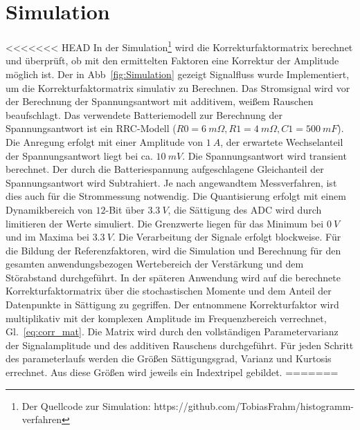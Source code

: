 \section{Simulation}

<<<<<<< HEAD
In der Simulation\footnote[2]{Der Quellcode zur Simulation: https://github.com/TobiasFrahm/histogramm-verfahren} wird die Korrekturfaktormatrix berechnet und überprüft, ob mit den ermittelten Faktoren eine Korrektur der Amplitude möglich ist. 
Der in Abb~\ref{fig:Simulation} gezeigt Signalfluss wurde Implementiert, um die Korrekturfaktormatrix simulativ zu Berechnen. Das Stromsignal wird vor der Berechnung der Spannungsantwort mit additivem, weißem Rauschen beaufschlagt. Das verwendete Batteriemodell zur Berechnung der Spannungsantwort ist ein RRC-Modell ($R0 = \SI{6}{m\Omega}, R1=\SI{4}{m\Omega}, C1=\SI{500}{mF}$). Die Anregung erfolgt mit einer Amplitude von $\SI{1}{A}$, der erwartete Wechselanteil der Spannungsantwort liegt bei ca. $\SI{10}{mV}$. Die Spannungsantwort wird transient berechnet. Der durch die Batteriespannung aufgeschlagene Gleichanteil der Spannungsantwort wird Subtrahiert. Je nach angewandtem Messverfahren, ist dies auch für die Strommessung notwendig. Die Quantisierung erfolgt mit einem Dynamikbereich von $12$-Bit über $\SI{3.3}{V}$, die Sättigung des ADC wird durch limitieren der Werte simuliert. Die Grenzwerte liegen für das Minimum bei $\SI{0}{V}$ und im Maxima bei $\SI{3.3}{V}$. Die Verarbeitung der Signale erfolgt blockweise. Für die Bildung der Referenzfaktoren, wird die Simulation und Berechnung für den gesamten anwendungsbezogen Wertebereich der Verstärkung und dem Störabstand durchgeführt. In der späteren Anwendung wird auf die berechnete Korrekturfaktormatrix über die stochastischen Momente und dem Anteil der Datenpunkte in Sättigung zu gegriffen. Der entnommene Korrekturfaktor wird multiplikativ mit der komplexen Amplitude im Frequenzbereich verrechnet, Gl.~\eqref{eq:corr_mat}. Die Matrix wird durch den vollständigen Parametervarianz der Signalamplitude und des additiven Rauschens durchgeführt. Für jeden Schritt des parameterlaufs werden die Größen Sättigungsgrad, Varianz und Kurtosis errechnet. Aus diese Größen wird jeweils ein Indextripel gebildet.
=======
